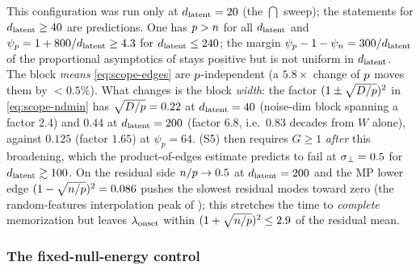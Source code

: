 \begin{remark}[$\pwidth=\dlat+\nsamp+300$]\label{rem:scope-psip}
This configuration was run only at $d_{\mathrm{latent}}=20$ (the $\dint$ sweep); the statements for $d_{\mathrm{latent}}\ge40$ are predictions. One has $p>n$ for all $d_{\mathrm{latent}}$ and $\psi_p=1+800/d_{\mathrm{latent}}\ge4.3$ for $d_{\mathrm{latent}}\le240$; the margin $\psi_p-1-\psi_n=300/d_{\mathrm{latent}}$ of the proportional asymptotics of \citet{bonnaire2025} stays positive but is not uniform in $d_{\mathrm{latent}}$. The block \emph{means} \eqref{eq:scope-edges} are $p$-independent (a $5.8\times$ change of $p$ moves them by $<0.5\%$). What changes is the block \emph{width}: the factor $(1\pm\sqrt{D/p})^2$ in \eqref{eq:scope-ndmin} has $\sqrt{D/p}=0.22$ at $d_{\mathrm{latent}}=40$ (noise-dim block spanning a factor $2.4$) and $0.44$ at $d_{\mathrm{latent}}=200$ (factor $6.8$, i.e.\ $0.83$ decades from $W$ alone), against $0.125$ (factor $1.65$) at $\psi_p=64$. (S5) then requires $G\ge1$ \emph{after} this broadening, which the product-of-edges estimate predicts to fail at $\sigma_{\perp}=0.5$ for $d_{\mathrm{latent}}\gtrsim100$. On the residual side $n/p\to0.5$ at $d_{\mathrm{latent}}=200$ and the MP lower edge $(1-\sqrt{n/p})^2=0.086$ pushes the slowest residual modes toward zero (the random-features interpolation peak of \citealp{mei2022generalization}); this stretches the time to \emph{complete} memorization but leaves $\lambda_{\rm onset}$ within $(1+\sqrt{n/p})^2\le2.9$ of the residual mean.
\end{remark}

\subsubsection{The fixed-null-energy control}

